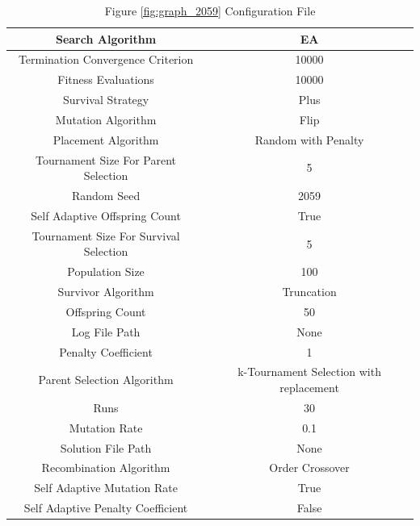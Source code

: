 \documentclass{standalone}
\begin{document}
\begin{table}[!htb]
	\centering
	\caption{Figure \ref{fig:graph_2059} Configuration File}
	\label{tab:graph_2059}
	\begin{tabular}{| c | c |}
		\hline
		Search Algorithm		& EA		 \\
		\hline
		Termination Convergence Criterion		& 10000		 \\
		\hline
		Fitness Evaluations		& 10000		 \\
		\hline
		Survival Strategy		& Plus		 \\
		\hline
		Mutation Algorithm		& Flip		 \\
		\hline
		Placement Algorithm		& Random with Penalty		 \\
		\hline
		Tournament Size For Parent Selection		& 5		 \\
		\hline
		Random Seed		& 2059		 \\
		\hline
		Self Adaptive Offspring Count		& True		 \\
		\hline
		Tournament Size For Survival Selection		& 5		 \\
		\hline
		Population Size		& 100		 \\
		\hline
		Survivor Algorithm		& Truncation		 \\
		\hline
		Offspring Count		& 50		 \\
		\hline
		Log File Path		& None		 \\
		\hline
		Penalty Coefficient		& 1		 \\
		\hline
		Parent Selection Algorithm		& k-Tournament Selection with replacement		 \\
		\hline
		Runs		& 30		 \\
		\hline
		Mutation Rate		& 0.1		 \\
		\hline
		Solution File Path		& None		 \\
		\hline
		Recombination Algorithm		& Order Crossover		 \\
		\hline
		Self Adaptive Mutation Rate		& True		 \\
		\hline
		Self Adaptive Penalty Coefficient		& False		 \\
		\hline
	\end{tabular}
\end{table}
\end{document}

